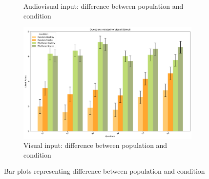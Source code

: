 \begin{figure}[htbp]
\begin{subfigure}[htbp]{0.5\textwidth}
        \caption{Audiovisual input: difference between population and condition}
        \label{fig: bar_audio_pop} 
    \end{subfigure} 
    \begin{subfigure}[htbp]{0.5\textwidth}
        \centering
        \includegraphics[width=\textwidth]{bar_plots/plot_pop_visual.png}
        \caption{Visual input: difference between population and condition}
        \label{fig: bar_audiovisual_pop} 
    \end{subfigure} 
    \caption{Bar plots representing difference between population and condition}
    \label{fig: difference in population}
\end{figure}
